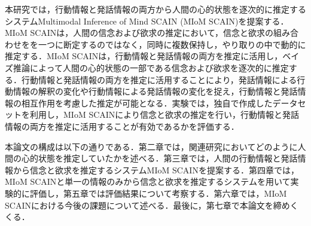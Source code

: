 \par
本研究では，行動情報と発話情報の両方から人間の心的状態を逐次的に推定するシステムMultimodal Inference of Mind SCAIN (MIoM SCAIN)を提案する．MIoM SCAINは，人間の信念および欲求の推定において，信念と欲求の組み合わせをを一つに断定するのではなく，同時に複数保持し，やり取りの中で動的に推定する．MIoM SCAINは，行動情報と発話情報の両方を推定に活用し，ベイズ推論によって人間の心的状態の一部である信念および欲求を逐次的に推定する．行動情報と発話情報の両方を推定に活用することにより，発話情報による行動情報の解釈の変化や行動情報による発話情報の変化を捉え，行動情報と発話情報の相互作用を考慮した推定が可能となる．実験では，独自で作成したデータセットを利用し，MIoM SCAINにより信念と欲求の推定を行い，行動情報と発話情報の両方を推定に活用することが有効であるかを評価する．

\par
本論文の構成は以下の通りである．第二章では，関連研究においてどのように人間の心的状態を推定していたかを述べる．第三章では，人間の行動情報と発話情報から信念と欲求を推定するシステムMIoM SCAINを提案する．第四章では，MIoM SCAINと単一の情報のみから信念と欲求を推定するシステムを用いて実験的に評価し，第五章では評価結果について考察する．第六章では，MIoM SCAINにおける今後の課題について述べる．最後に，第七章で本論文を締めくくる．
